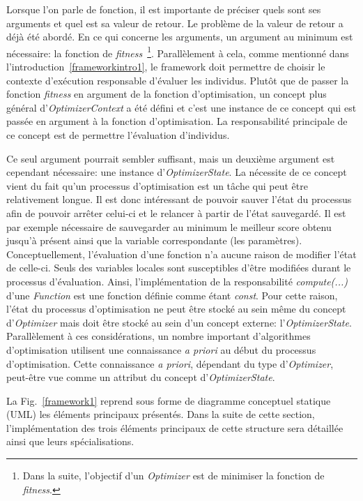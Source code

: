 \documentclass[a4paper, 11pt]{report}
\begin{document}
Lorsque l'on parle de fonction, il est importante de préciser quels sont ses arguments et quel est sa valeur de retour. Le problème de la valeur de retour a déjà été abordé. En ce qui concerne les arguments, un argument au minimum est nécessaire: la fonction de \textit{fitness}~\footnote{Dans la suite, l'objectif d'un \textit{Optimizer} est de minimiser la fonction de \textit{fitness}.}. Parallèlement à cela, comme mentionné dans l'introduction~\ref{frameworkintro1}, le framework doit permettre de choisir le contexte d'exécution responsable d'évaluer les individus. Plutôt que de passer la fonction \textit{fitness} en argument de la fonction d'optimisation, un concept plus général d'\textit{OptimizerContext} a été défini et c'est une instance de ce concept qui est passée en argument à la fonction d'optimisation. La responsabilité principale de ce concept est de permettre l'évaluation d'individus. %

Ce seul argument pourrait sembler suffisant, mais un deuxième argument est cependant nécessaire: une instance d'\textit{OptimizerState}. La nécessite de ce concept vient du fait qu'un processus d'optimisation est un tâche qui peut être relativement longue. Il est donc intéressant de pouvoir sauver l'état du processus afin de pouvoir arrêter celui-ci et le relancer à partir de l'état sauvegardé. Il est par exemple nécessaire de sauvegarder au minimum le meilleur score obtenu jusqu'à présent ainsi que la variable correspondante (les paramètres). Conceptuellement, l'évaluation d'une fonction n'a aucune raison de modifier l'état de celle-ci. Seuls des variables locales sont susceptibles d'être modifiées durant le processus d'évaluation. Ainsi, l'implémentation de la responsabilité \textit{compute(...)} d'une \textit{Function} est une fonction définie comme étant \textit{const}. Pour cette raison, l'état du processus d'optimisation ne peut être stocké au sein même du concept d'\textit{Optimizer} mais doit être stocké au sein d'un concept externe: l'\textit{OptimizerState}. Parallèlement à ces considérations, un nombre important d'algorithmes d'optimisation utilisent une connaissance \textit{a priori} au début du processus d'optimisation. Cette connaissance \textit{a priori}, dépendant du type d'\textit{Optimizer}, peut-être vue comme un attribut du concept d'\textit{OptimizerState}. %
 
La Fig.~\ref{framework1} reprend sous forme de diagramme conceptuel statique (UML) les éléments principaux présentés. Dans la suite de cette section, l'implémentation des trois éléments principaux de cette structure sera détaillée ainsi que leurs spécialisations.
\end{document}
